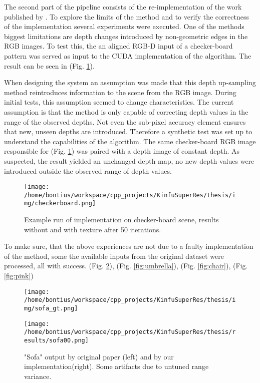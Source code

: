 \documentclass{ucl_thesis}
\newcommand{\figref}[1]{(Fig. \ref{#1})}
\begin{document}
\par The second part of the pipeline consists of the re-implementation of the work published by \citep{cvpr-07-qingxiong-yang}. To explore the limits of the method and to verify the correctness of the implementation several experiments were executed. One of the methods biggest limitations are depth changes introduced by non-geometric edges in the RGB images. To test this, the an aligned RGB-D input of a checker-board pattern was served as input to the CUDA implementation of the algorithm. The result can be seen in \figref{fig:yang_checkerboard}. 
\par When designing the system an assumption was made that this depth up-sampling method reintroduces information to the scene from the RGB image. During initial tests, this assumption seemed to change characteristics. The current assumption is that the method is only capable of correcting depth values in the range of the observed depths. Not even the sub-pixel accuracy element ensures that new, unseen depths are introduced. Therefore a synthetic test was set up to understand the capabilities of the algorithm. The same checker-board RGB image responsible for \figref{fig:yang_checkerboard} was paired with a depth image of constant depth. As suspected, the result yielded an unchanged depth map, no new depth values were introduced outside the observed range of depth values.

\begin{figure}[h!]\centering 
        \texttt{[image: /home/bontius/workspace/cpp\_projects/KinfuSuperRes/thesis/img/checkerboard.png]}        
        \caption{Example run of implementation on checker-board scene, results without and with texture after 50 iterations.}
        \label{fig:yang_checkerboard}
\end{figure}

To make sure, that the above experiences are not due to a faulty implementation of the method, some the available inputs from the original dataset were processed, all with success. \figref{fig:sofa}, \figref{fig:umbrella}, \figref{fig:chair}, \figref{fig:pink}

\begin{figure}[h!]\centering
	\begin{minipage}[b]{0.49\linewidth}\centering
		\texttt{[image: /home/bontius/workspace/cpp\_projects/KinfuSuperRes/thesis/img/sofa\_gt.png]}
	\end{minipage}
	\begin{minipage}[b]{0.49\linewidth}\centering
		\texttt{[image: /home/bontius/workspace/cpp\_projects/KinfuSuperRes/thesis/results/sofa00.png]}
	\end{minipage}
	\caption{"Sofa" output by original paper (left) and by our implementation(right). Some artifacts due to untuned range variance.}
	\label{fig:sofa}
\end{figure}
\end{document}
